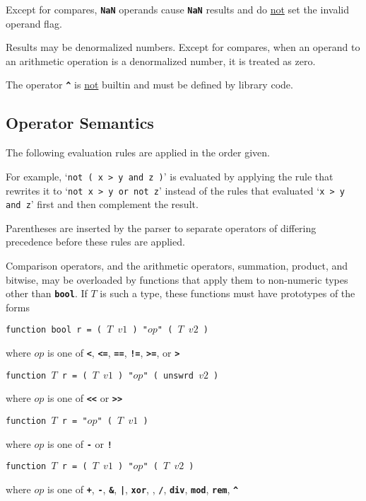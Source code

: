 \documentclass[12pt]{article}
\newcommand{\TT}[1]{{\tt \bfseries #1}}
\newenvironment{indpar}[1][0.3in]%
	{\begin{list}{}%
		     {\setlength{\itemsep}{0in}%
		      \setlength{\topsep}{0in}%
		      \setlength{\parsep}{1ex}%
		      \setlength{\labelwidth}{#1}%
		      \setlength{\leftmargin}{#1}%
		      \addtolength{\leftmargin}{\labelsep}}%
	 \item}%
	{\end{list}}
\begin{document}
Except for compares, \TT{NaN} operands cause \TT{NaN} results and
do \underline{not} set the invalid operand flag.

Results may be denormalized numbers.  Except for compares,
when an operand to an arithmetic operation is a denormalized
number, it is treated as zero.

The operator
\TT{\textasciicircum} is \underline{not} builtin and must be
defined by library code.

\subsection{Operator Semantics}

The following evaluation rules are applied in the order given.

For example, `{\tt not ( x > y and z )}' is evaluated by applying
the rule that rewrites it to `{\tt not x > y or not z}' instead of
the rules that evaluated `{\tt x > y and z}' first and then complement
the result.

Parentheses are inserted by the parser to separate operators of
differing precedence before these rules are applied.

Comparison operators, and the
arithmetic operators, summation, product, and bitwise, 
may be overloaded by functions that apply them to non-numeric
types other than \TT{bool}.
If $T$ is such a type, these functions must have prototypes
of the forms
\begin{indpar}
{\tt function bool r = ( $T$ $v1$ ) "$op$" ( $T$ $v2$ )}
\begin{indpar}
where $op$ is one of \TT{<}, \TT{<=}, \TT{==}, \TT{!=}, \TT{>=}, or \TT{>}
\end{indpar}

{\tt function $T$ r = ( $T$ $v1$ ) "$op$" ( unswrd $v2$ )}
\begin{indpar}
where $op$ is one of \TT{<{}<} or \TT{>{}>}
\end{indpar}

{\tt function $T$ r = "$op$" ( $T$ $v1$ )}
\begin{indpar}
where $op$ is one of \TT{-} or \TT{!}
\end{indpar}

{\tt function $T$ r = ( $T$ $v1$ ) "$op$" ( $T$ $v2$ )}
\begin{indpar}
where $op$ is one of
    \TT{+}, \TT{-}, \TT{\&}, \TT{|}, \TT{xor},
    \TT{*}, \TT{/}, \TT{div}, \TT{mod}, \TT{rem}, \TT{\textasciicircum}
\end{indpar}
\end{indpar}
\end{document}
